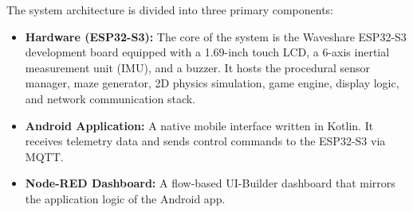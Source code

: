 The system architecture is divided into three primary components:

\begin{itemize}
    \item \textbf{Hardware (ESP32-S3):} The core of the system is the Waveshare ESP32-S3 development board equipped with a 1.69-inch touch LCD, a 6-axis inertial measurement unit (IMU), and a buzzer. It hosts the procedural sensor manager, maze generator, 2D physics simulation, game engine, display logic, and network communication stack.
    \item \textbf{Android Application:} A native mobile interface written in Kotlin. It receives telemetry data and sends control commands to the ESP32-S3 via MQTT.
    \item \textbf{Node-RED Dashboard:} A flow-based UI-Builder dashboard that mirrors the application logic of the Android app.
\end{itemize}